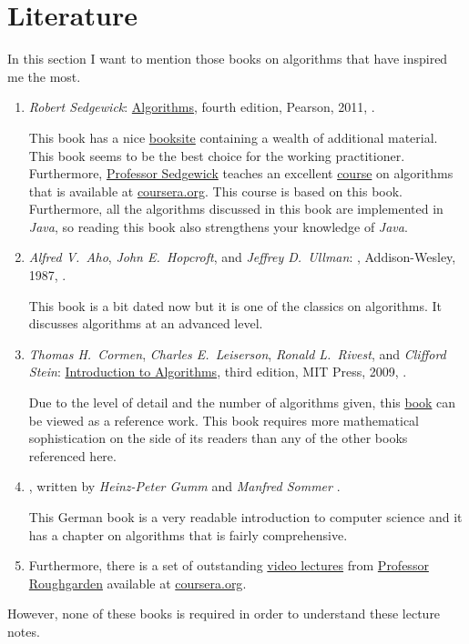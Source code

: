 \section{Literature}
In this section I want to mention those books on algorithms that have inspired me the most.
\begin{enumerate}
\item \textsl{Robert Sedgewick}: \href{https://www.amazon.com/Algorithms-4th-Robert-Sedgewick/dp/032157351X}{Algorithms}, 
      fourth edition, Pearson, 2011, \cite{sedgewick:11}.
    
      This book has a nice \href{http://algs4.cs.princeton.edu/home/}{booksite} containing a wealth
      of additional material.  This book seems to be the best choice for the working practitioner.
      Furthermore, \href{http://www.cs.princeton.edu/~rs/}{Professor Sedgewick} teaches an excellent 
      \href{https://www.coursera.org/course/algs4partI}{course} on algorithms that is available at
      \href{https://www.coursera.org/}{coursera.org}.  This course is based on this book.  Furthermore, all
      the algorithms discussed in this book are implemented in \textsl{Java}, so reading this book
      also strengthens your knowledge of \textsl{Java}.
\item \textsl{Alfred V.~Aho}, \textsl{John E.~Hopcroft}, and \textsl{Jeffrey D.~Ullman}:
      , Addison-Wesley, 1987, \cite{aho:87}.
      
      This book is a bit dated now but it is one of the classics on algorithms.  It discusses algorithms at an
      advanced level.
\item \textsl{Thomas H.~Cormen}, \textsl{Charles E.~Leiserson}, 
      \textsl{Ronald L.~Rivest}, and \textsl{Clifford Stein}:
      \href{https://www.amazon.com/Introduction-Algorithms-3rd-MIT-Press/dp/0262033844}{Introduction to Algorithms}, 
      third edition, MIT Press, 2009, \cite{cormen:09}.

      Due to the level of detail and the number of algorithms given, this
      \href{https://en.wikipedia.org/wiki/Introduction_to_Algorithms}{book} can be viewed as a reference work. 
      This book requires more mathematical sophistication on the side of its readers than any of the
      other books referenced here.  
\item {},
      written by \textsl{Heinz-Peter Gumm} and \textsl{Manfred Sommer} \cite{gumm:2013}.
      
      This German book is a very readable introduction to computer science and it has a chapter
      on algorithms that is fairly comprehensive.  
\item Furthermore, there is a set of outstanding 
      \href{https://class.coursera.org/algo-004/class/index}{video lectures} 
      from \href{http://theory.stanford.edu/~tim/}{Professor Roughgarden}
      available at \href{https://www.coursera.org/}{coursera.org}.
\end{enumerate}
However, none of these books is required in order to understand these lecture notes.


